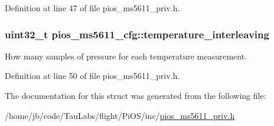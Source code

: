 \-Definition at line 47 of file pios\-\_\-ms5611\-\_\-priv.\-h.

\hypertarget{structpios__ms5611__cfg_a9e5737bd6a7bb20da4ac013fb0726845}{
\subsubsection[{temperature\-\_\-interleaving}]{\setlength{\rightskip}{0pt plus 5cm}uint32\-\_\-t {\bf pios\-\_\-ms5611\-\_\-cfg\-::temperature\-\_\-interleaving}}}\label{structpios__ms5611__cfg_a9e5737bd6a7bb20da4ac013fb0726845}


\-How many samples of pressure for each temperature measurement. 



\-Definition at line 50 of file pios\-\_\-ms5611\-\_\-priv.\-h.



\-The documentation for this struct was generated from the following file\-:\begin{DoxyCompactItemize}
\item 
/home/jb/code/\-Tau\-Labs/flight/\-Pi\-O\-S/inc/\hyperlink{pios__ms5611__priv_8h}{pios\-\_\-ms5611\-\_\-priv.\-h}\end{DoxyCompactItemize}
